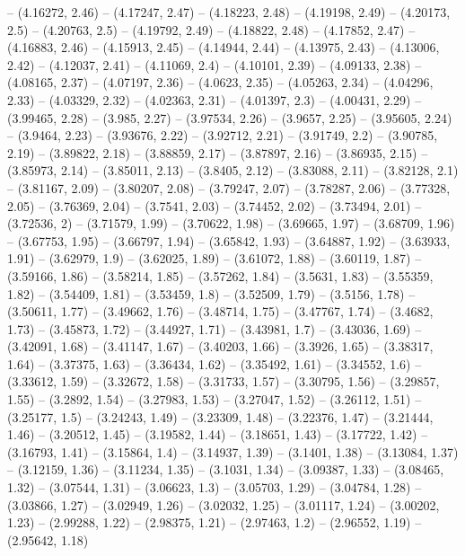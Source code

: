 -- (4.16272, 2.46)
-- (4.17247, 2.47)
-- (4.18223, 2.48)
-- (4.19198, 2.49)
-- (4.20173, 2.5)
-- (4.20763, 2.5)
-- (4.19792, 2.49)
-- (4.18822, 2.48)
-- (4.17852, 2.47)
-- (4.16883, 2.46)
-- (4.15913, 2.45)
-- (4.14944, 2.44)
-- (4.13975, 2.43)
-- (4.13006, 2.42)
-- (4.12037, 2.41)
-- (4.11069, 2.4)
-- (4.10101, 2.39)
-- (4.09133, 2.38)
-- (4.08165, 2.37)
-- (4.07197, 2.36)
-- (4.0623, 2.35)
-- (4.05263, 2.34)
-- (4.04296, 2.33)
-- (4.03329, 2.32)
-- (4.02363, 2.31)
-- (4.01397, 2.3)
-- (4.00431, 2.29)
-- (3.99465, 2.28)
-- (3.985, 2.27)
-- (3.97534, 2.26)
-- (3.9657, 2.25)
-- (3.95605, 2.24)
-- (3.9464, 2.23)
-- (3.93676, 2.22)
-- (3.92712, 2.21)
-- (3.91749, 2.2)
-- (3.90785, 2.19)
-- (3.89822, 2.18)
-- (3.88859, 2.17)
-- (3.87897, 2.16)
-- (3.86935, 2.15)
-- (3.85973, 2.14)
-- (3.85011, 2.13)
-- (3.8405, 2.12)
-- (3.83088, 2.11)
-- (3.82128, 2.1)
-- (3.81167, 2.09)
-- (3.80207, 2.08)
-- (3.79247, 2.07)
-- (3.78287, 2.06)
-- (3.77328, 2.05)
-- (3.76369, 2.04)
-- (3.7541, 2.03)
-- (3.74452, 2.02)
-- (3.73494, 2.01)
-- (3.72536, 2)
-- (3.71579, 1.99)
-- (3.70622, 1.98)
-- (3.69665, 1.97)
-- (3.68709, 1.96)
-- (3.67753, 1.95)
-- (3.66797, 1.94)
-- (3.65842, 1.93)
-- (3.64887, 1.92)
-- (3.63933, 1.91)
-- (3.62979, 1.9)
-- (3.62025, 1.89)
-- (3.61072, 1.88)
-- (3.60119, 1.87)
-- (3.59166, 1.86)
-- (3.58214, 1.85)
-- (3.57262, 1.84)
-- (3.5631, 1.83)
-- (3.55359, 1.82)
-- (3.54409, 1.81)
-- (3.53459, 1.8)
-- (3.52509, 1.79)
-- (3.5156, 1.78)
-- (3.50611, 1.77)
-- (3.49662, 1.76)
-- (3.48714, 1.75)
-- (3.47767, 1.74)
-- (3.4682, 1.73)
-- (3.45873, 1.72)
-- (3.44927, 1.71)
-- (3.43981, 1.7)
-- (3.43036, 1.69)
-- (3.42091, 1.68)
-- (3.41147, 1.67)
-- (3.40203, 1.66)
-- (3.3926, 1.65)
-- (3.38317, 1.64)
-- (3.37375, 1.63)
-- (3.36434, 1.62)
-- (3.35492, 1.61)
-- (3.34552, 1.6)
-- (3.33612, 1.59)
-- (3.32672, 1.58)
-- (3.31733, 1.57)
-- (3.30795, 1.56)
-- (3.29857, 1.55)
-- (3.2892, 1.54)
-- (3.27983, 1.53)
-- (3.27047, 1.52)
-- (3.26112, 1.51)
-- (3.25177, 1.5)
-- (3.24243, 1.49)
-- (3.23309, 1.48)
-- (3.22376, 1.47)
-- (3.21444, 1.46)
-- (3.20512, 1.45)
-- (3.19582, 1.44)
-- (3.18651, 1.43)
-- (3.17722, 1.42)
-- (3.16793, 1.41)
-- (3.15864, 1.4)
-- (3.14937, 1.39)
-- (3.1401, 1.38)
-- (3.13084, 1.37)
-- (3.12159, 1.36)
-- (3.11234, 1.35)
-- (3.1031, 1.34)
-- (3.09387, 1.33)
-- (3.08465, 1.32)
-- (3.07544, 1.31)
-- (3.06623, 1.3)
-- (3.05703, 1.29)
-- (3.04784, 1.28)
-- (3.03866, 1.27)
-- (3.02949, 1.26)
-- (3.02032, 1.25)
-- (3.01117, 1.24)
-- (3.00202, 1.23)
-- (2.99288, 1.22)
-- (2.98375, 1.21)
-- (2.97463, 1.2)
-- (2.96552, 1.19)
-- (2.95642, 1.18)
